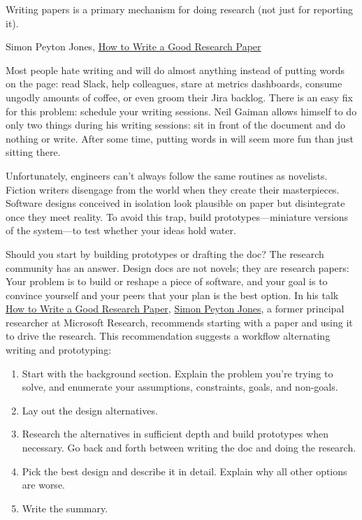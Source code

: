 \documentclass{article}
\begin{document}
\epigraph{
Writing papers is a primary mechanism for doing research (not just for reporting it).
}{Simon Peyton Jones, \href{https://youtu.be/WP-FkUaOcOM}{How to Write a Good Research Paper}}

Most people hate writing and will do almost anything instead of putting words on the page: read Slack, help colleagues, stare at metrics dashboards, consume ungodly amounts of coffee, or even groom their Jira backlog.
There is an easy fix for this problem: schedule your writing sessions.
Neil Gaiman allows himself to do only two things during his writing sessions: sit in front of the document and do nothing or write.
After some time, putting words in will seem more fun than just sitting there.

Unfortunately, engineers can't always follow the same routines as novelists.
Fiction writers disengage from the world when they create their masterpieces.
Software designs conceived in isolation look plausible on paper but disintegrate once they meet reality.
To avoid this trap, build prototypes---miniature versions of the system---to test whether your ideas hold water.

Should you start by building prototypes or drafting the doc?
The research community has an answer.
Design docs are not novels; they are research papers:
Your problem is to build or reshape a piece of software, and your goal is to convince yourself and your peers that your plan is the best option.
In his talk \href{https://youtu.be/WP-FkUaOcOM}{How to Write a Good Research Paper}, \href{https://simon.peytonjones.org/}{Simon Peyton Jones}, a former principal researcher at Microsoft Research, recommends starting with a paper and using it to drive the research.
This recommendation suggests a workflow alternating writing and prototyping:
\begin{enumerate}
\item Start with the background section.
  Explain the problem you're trying to solve, and enumerate your assumptions, constraints, goals, and non-goals.
\item Lay out the design alternatives.
\item Research the alternatives in sufficient depth and build prototypes when necessary.
  Go back and forth between writing the doc and doing the research.
\item Pick the best design and describe it in detail.
  Explain why all other options are worse.
\item Write the summary.
\end{enumerate}
\end{document}
